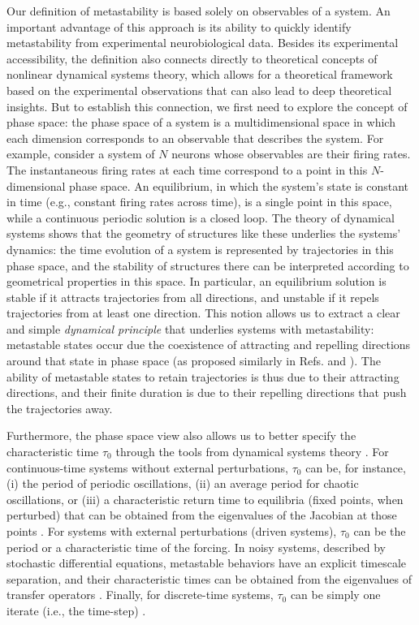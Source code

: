 \documentclass[reprint,superscriptaddress,showpacs,amsmath,amssymb,aps,floatfix,nolongbibliography]{revtex4-2}
\theoremstyle{definition}
\begin{document}
Our definition of metastability is based solely on observables of a system. An important advantage of this approach is its ability to quickly identify metastability from experimental neurobiological data. Besides its experimental accessibility, the definition also connects directly to theoretical concepts of nonlinear dynamical systems theory, which allows for a theoretical framework based on the experimental observations that can also lead to deep theoretical insights. But to establish this connection, we first need to explore the concept of phase space: the phase space of a system is a multidimensional space in which each dimension corresponds to an observable that describes the system. For example, consider a system of $N$ neurons whose observables are their firing rates. The instantaneous firing rates at each time correspond to a point in this $N$-dimensional phase space. An equilibrium, in which the system's state is constant in time (e.g., constant firing rates across time), is a single point in this space, while a continuous periodic solution is a closed loop. The theory of dynamical systems shows that the geometry of structures like these underlies the systems' dynamics: the time evolution of a system is represented by trajectories in this phase space, and the stability of structures there can be interpreted according to geometrical properties in this space. In particular, an equilibrium  solution is stable if it attracts trajectories from all directions, and unstable if it repels trajectories from at least one direction. This notion allows us to extract a clear and simple \textit{dynamical principle} that underlies systems with metastability: metastable states occur due the coexistence of attracting and repelling directions around that state in phase space (as proposed similarly in Refs. \cite{tognoli2014metastable} and \cite{kaneko2003chaotic}). The ability of metastable states to retain trajectories is thus due to their attracting directions, and their finite duration is due to their repelling directions that push the trajectories away. 

Furthermore, the phase space view also allows us to better specify the characteristic time $\tau_0$ through the tools from dynamical systems theory \cite{lai2009transient}. For continuous-time systems without external perturbations, $\tau_0$ can be, for instance, (i) the period of periodic oscillations, (ii) an average period for chaotic oscillations, or (iii) a characteristic return time to equilibria (fixed points, when perturbed) that can be obtained from the eigenvalues of the Jacobian at those points \cite{strogatz2002nonlinear}. For systems with external perturbations (driven systems), $\tau_0$ can be the period or a characteristic time of the forcing. In noisy systems, described by stochastic differential equations, metastable behaviors have an explicit timescale separation, and their characteristic times can be obtained from the eigenvalues of transfer operators \cite{bittracher2018transition, bittracher2021dimensionality}. Finally, for discrete-time systems, $\tau_0$ can be simply one iterate (i.e., the time-step) \cite{lai2009transient}. %
\end{document}
